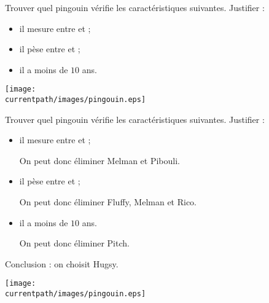 \begin{exercice}
    Trouver quel pingouin vérifie les caractéristiques suivantes. Justifier :
    \begin{itemize}
       \item il mesure entre  et  ;
       \item il pèse entre  et  ;
       \item il a moins de $10$ ans.
    \end{itemize}
   \begin{center}
       \texttt{[image: \\currentpath/images/pingouin.eps]}
    \end{center}
\end{exercice}
 
\begin{corrige}
    Trouver quel pingouin vérifie les caractéristiques suivantes. Justifier :
    \begin{itemize}
       \item il mesure entre  et  ;
       
       {\color{red} On peut donc éliminer Melman et Pibouli.}
       \item il pèse entre  et  ;
       
       {\color{red} On peut donc éliminer Fluffy, Melman et Rico.}
       \item il a moins de $10$ ans.
       
       {\color{red} On peut donc éliminer Pitch.}
    \end{itemize}

    {\red Conclusion : on choisit Hugsy}.
    
   \begin{center}
       \hspace*{-10mm}
       \texttt{[image: \\currentpath/images/pingouin.eps]}
    \end{center}
\end{corrige}